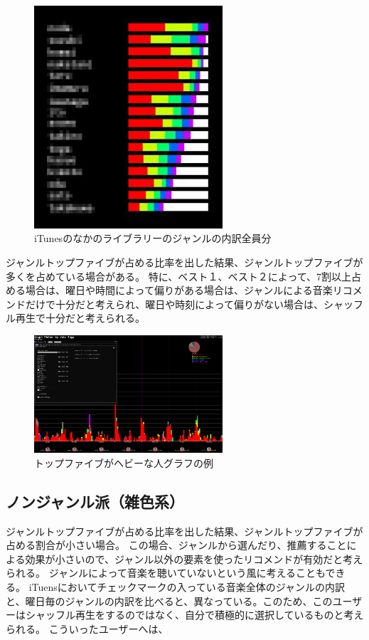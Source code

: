 \documentclass[11pt, twocolumn]{jsarticle}
\begin{document}
\begin{figure}[h]
\begin{center}
\includegraphics[width=7cm]{sortedOther.jpg}
\caption{iTunesのなかのライブラリーのジャンルの内訳全員分}
\label{sortedOther}
\end{center}
\end{figure}


ジャンルトップファイブが占める比率を出した結果、ジャンルトップファイブが多くを占めている場合がある。
特に、ベスト１、ベスト２によって、7割以上占める場合は、曜日や時間によって偏りがある場合は、ジャンルによる音楽リコメンドだけで十分だと考えられ、曜日や時刻によって偏りがない場合は、シャッフル再生で十分だと考えられる。
\begin{figure}[h]
\begin{center}
\includegraphics[width=7cm]{topFive_heavy.png}
\caption{トップファイブがヘビーな人グラフの例}
\label{topFive_heavy}
\end{center}
\end{figure}

\subsection{ノンジャンル派（雑色系）}
ジャンルトップファイブが占める比率を出した結果、ジャンルトップファイブが占める割合が小さい場合。
この場合、ジャンルから選んだり、推薦することによる効果が小さいので、ジャンル以外の要素を使ったリコメンドが有効だと考えられる。
ジャンルによって音楽を聴いていないという風に考えることもできる。
iTuensにおいてチェックマークの入っている音楽全体のジャンルの内訳と、曜日毎のジャンルの内訳を比べると、異なっている。このため、このユーザーはシャッフル再生をするのではなく、自分で積極的に選択しているものと考えられる。
こういったユーザーへは、
\end{document}

